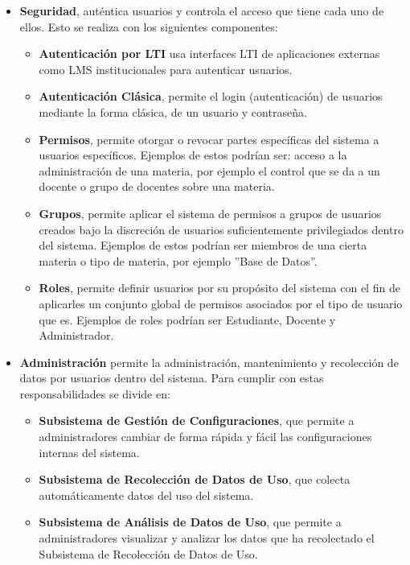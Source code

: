\begin{itemize}
	\item \textbf{Seguridad}, auténtica usuarios y controla el acceso que tiene cada uno de ellos. Esto se realiza con los siguientes componentes:
    \begin{itemize}
    	\item \textbf{Autenticación por LTI} usa interfaces LTI  de aplicaciones externas como LMS  institucionales para autenticar usuarios. 
		\item \textbf{Autenticación Clásica}, permite el login (autenticación) de usuarios mediante la forma clásica, de un usuario y contraseña.
		\item \textbf{Permisos}, permite otorgar o revocar partes específicas del sistema a usuarios específicos. Ejemplos de estos podrían ser: acceso a la administración de una materia, por ejemplo el control que se da a un docente o grupo de docentes sobre una materia.
		\item \textbf{Grupos}, permite aplicar el sistema de permisos a grupos de usuarios creados bajo la discreción de usuarios suficientemente privilegiados dentro del sistema. Ejemplos de estos podrían ser miembros de una cierta materia o tipo de materia, por ejemplo ''Base de Datos''.
		\item \textbf{Roles}, permite definir usuarios por su propósito del sistema con el fin de aplicarles un conjunto global de permisos asociados por el tipo de usuario que es. Ejemplos de roles podrían ser Estudiante, Docente y Administrador.
    \end{itemize}
    \item \textbf{Administración} permite la administración, mantenimiento y recolección de datos por usuarios dentro del sistema. Para cumplir con estas responsabilidades se divide en:
    \begin{itemize}
    	\item \textbf{Subsistema de Gestión de Configuraciones}, que permite a administradores cambiar de forma rápida y fácil las configuraciones internas del sistema.
        \item \textbf{Subsistema de Recolección de Datos de Uso}, que colecta automáticamente datos del uso del sistema. 
        \item \textbf{Subsistema de Análisis de Datos de Uso}, que permite a administradores visualizar y analizar los datos que ha recolectado el Subsistema de Recolección de Datos de Uso. 

\end{itemize}
\end{itemize}

